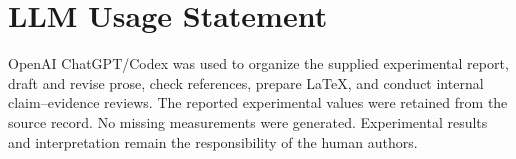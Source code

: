 \documentclass[10pt,twocolumn,letterpaper]{article}
\begin{document}
\section*{LLM Usage Statement}
OpenAI ChatGPT/Codex was used to organize the supplied experimental report, draft and revise prose, check references, prepare LaTeX, and conduct internal claim--evidence reviews. The reported experimental values were retained from the source record. No missing measurements were generated. Experimental results and interpretation remain the responsibility of the human authors.

{\small


}
\end{document}
